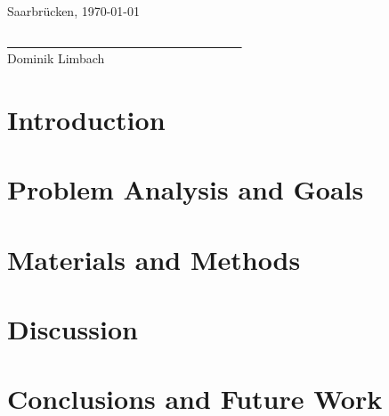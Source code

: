 \documentclass[
    12pt,
    a4paper,
	chapterprefix=false,
	parskip=full,
	headings=normal,
	numbers=noenddot
]{scrreprt}
\begin{document}
\vspace{1cm}

Saarbrücken, \today\\

\vspace{1.5cm}

\underline{~ ~ ~ ~ ~ ~ ~ ~ ~ ~ ~ ~ ~ ~ ~ ~ ~ ~ ~ ~ ~ ~ ~}\\
\small
Dominik Limbach
\normalsize

\newpage

\renewcommand{\contentsname}{Contents}
\hypersetup{linkcolor=black}
\tableofcontents
\hypersetup{linkcolor=darkblue}

\newpage


\chapter{Introduction}




\chapter{Problem Analysis and Goals}




\chapter{Materials and Methods}





%


\chapter{Discussion}




\chapter{Conclusions and Future Work}




%

\newpage


\hypersetup{linkcolor=black}
\listoffigures
\hypersetup{linkcolor=darkblue}

%
%

\newpage

\renewcommand{\bibname}{Bibliography}


\end{document}
